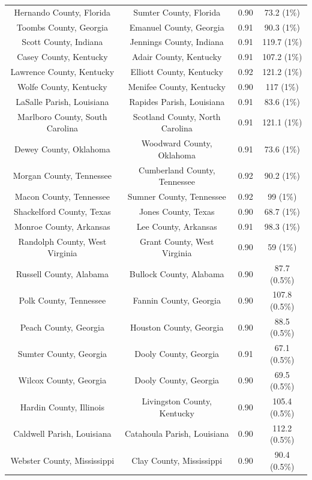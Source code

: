 \begin{longtable}{cccc}
  Hernando County, Florida & Sumter County, Florida & 0.90 & 73.2 (1\%) \\ 
  Toombs County, Georgia & Emanuel County, Georgia & 0.91 & 90.3 (1\%) \\ 
  Scott County, Indiana & Jennings County, Indiana & 0.91 & 119.7 (1\%) \\ 
  Casey County, Kentucky & Adair County, Kentucky & 0.91 & 107.2 (1\%) \\ 
  Lawrence County, Kentucky & Elliott County, Kentucky & 0.92 & 121.2 (1\%) \\ 
  Wolfe County, Kentucky & Menifee County, Kentucky & 0.90 & 117 (1\%) \\ 
  LaSalle Parish, Louisiana & Rapides Parish, Louisiana & 0.91 & 83.6 (1\%) \\ 
  Marlboro County, South Carolina & Scotland County, North Carolina & 0.91 & 121.1 (1\%) \\ 
  Dewey County, Oklahoma & Woodward County, Oklahoma & 0.91 & 73.6 (1\%) \\ 
  Morgan County, Tennessee & Cumberland County, Tennessee & 0.92 & 90.2 (1\%) \\ 
  Macon County, Tennessee & Sumner County, Tennessee & 0.92 & 99 (1\%) \\ 
  Shackelford County, Texas & Jones County, Texas & 0.90 & 68.7 (1\%) \\ 
  Monroe County, Arkansas & Lee County, Arkansas & 0.91 & 98.3 (1\%) \\ 
  Randolph County, West Virginia & Grant County, West Virginia & 0.90 & 59 (1\%) \\ 
  Russell County, Alabama & Bullock County, Alabama & 0.90 & 87.7 (0.5\%) \\ 
  Polk County, Tennessee & Fannin County, Georgia & 0.90 & 107.8 (0.5\%) \\ 
  Peach County, Georgia & Houston County, Georgia & 0.90 & 88.5 (0.5\%) \\ 
  Sumter County, Georgia & Dooly County, Georgia & 0.91 & 67.1 (0.5\%) \\ 
  Wilcox County, Georgia & Dooly County, Georgia & 0.90 & 69.5 (0.5\%) \\ 
  Hardin County, Illinois & Livingston County, Kentucky & 0.90 & 105.4 (0.5\%) \\ 
  Caldwell Parish, Louisiana & Catahoula Parish, Louisiana & 0.90 & 112.2 (0.5\%) \\ 
  Webster County, Mississippi & Clay County, Mississippi & 0.90 & 90.4 (0.5\%) \\ 

\end{longtable}
